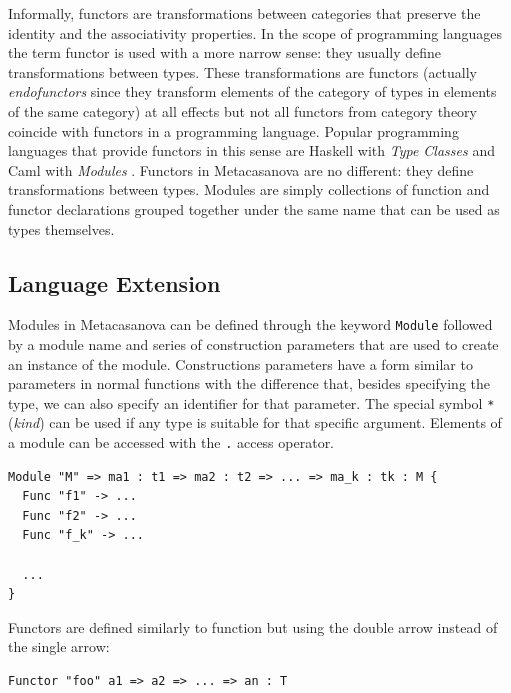 \noindent
Informally, functors are transformations between categories that preserve the identity and the associativity properties. In the scope of programming languages the term functor is used with a more narrow sense: they usually define transformations between types. These transformations are functors (actually \textit{endofunctors} since they transform elements of the category of types in elements of the same category) at all effects but not all functors from category theory coincide with functors in a programming language. Popular programming languages that provide functors in this sense are Haskell with \textit{Type Classes} \cite{jones1995functional, kiselyov2004strongly, mcbride2002faking, thompson1999haskell, wadler1989make} and Caml with \textit{Modules} \cite{leroy2000modular, paulson1996ml, wehr2008ml}. Functors in Metacasanova are no different: they define transformations between types. Modules are simply collections of function and functor declarations grouped together under the same name that can be used as types themselves.

\subsection{Language Extension}
\label{subsec:ch_functors_language_extension}
Modules in Metacasanova can be defined through the keyword \texttt{Module} followed by a module name and series of construction parameters that are used to create an instance of the module. Constructions parameters have a form similar to parameters in normal functions with the difference that, besides specifying the type, we can also specify an identifier for that parameter. The special symbol \texttt{*} (\textit{kind}) can be used if any type is suitable for that specific argument. Elements of a module can be accessed with the \texttt{.} access operator.

\begin{lstlisting}
Module "M" => ma1 : t1 => ma2 : t2 => ... => ma_k : tk : M {
  Func "f1" -> ...
  Func "f2" -> ...
  Func "f_k" -> ...
  
  ...
} 
\end{lstlisting}

\noindent
Functors are defined similarly to function but using the double arrow instead of the single arrow:

\begin{lstlisting}
Functor "foo" a1 => a2 => ... => an : T
\end{lstlisting}

